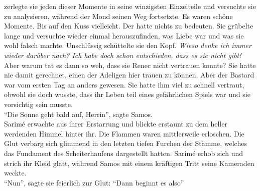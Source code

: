 zerlegte sie jeden dieser Momente in seine winzigsten Einzelteile und versuchte sie zu analysieren, 
während der Mond seinen Weg fortsetzte. Es waren schöne Momente. Bis auf den Kuss vielleicht. Der 
hatte nichts zu bedeuten. Sie grübelte lange und versuchte wieder einmal herauszufinden, was Liebe 
war und was sie wohl falsch machte. Unschlüssig schüttelte sie den Kopf. \textit{Wieso denke ich 
immer wieder darüber nach? Ich habe doch schon entschieden, dass es sie nicht gibt!}\\
Aber warum tat es dann so weh, dass sie Renec nicht vertrauen konnte? Sie hatte nie damit 
gerechnet, einen der Adeligen hier trauen zu können. Aber der Bastard war vom ersten Tag an anders 
gewesen. Sie hatte ihm viel zu schnell vertraut, obwohl sie doch wusste, dass ihr Leben teil eines 
gefährlichen Spiels war und sie vorsichtig sein musste.\\
``Die Sonne geht bald auf, Herrin'', sagte Samos. \\
Sarimé erwachte aus ihrer Erstarrung und blickte erstaunt zu dem heller werdenden Himmel hinter 
ihr. Die Flammen waren mittlerweile erloschen. Die Glut verbarg sich glimmend in den letzten tiefen 
Furchen der Stämme, welches das Fundament des Scheiterhaufens dargestellt hatten. Sarimé erhob sich 
und strich ihr Kleid glatt, während Samos mit einem kräftigen Tritt seine Kameraden weckte. \\
``Nun'', sagte sie feierlich zur Glut: ``Dann beginnt es also'' \\


